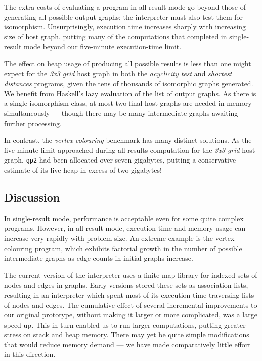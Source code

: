 The extra costs of evaluating a program in all-result mode go beyond those of generating all possible output graphs; the interpreter must also test them for isomorphism. Unsurprisingly, execution time increases sharply with increasing size of host graph, putting many of the computations that completed in single-result mode beyond our five-minute execution-time limit.

The effect on heap usage of producing all possible results is less than one might expect for the \textit{3x3 grid} host graph in both the \textit{acyclicity test} and \textit{shortest distances} programs, given the tens of thousands of isomorphic graphs generated. We benefit from Haskell's lazy evaluation of the list of output graphs.
As there is a single isomorphism class, at most two final host graphs are needed in memory simultaneously --- though there may be many intermediate graphs awaiting further processing.

In contrast, the \textit{vertex colouring} benchmark has many distinct solutions.
As the five minute limit approached during all-results computation for the \textit{3x3 grid} host graph, \texttt{gp2} had been allocated over seven gigabytes, putting a conservative estimate of its live heap in excess of two gigabytes!

\subsection{Discussion}

In single-result mode, performance is acceptable even for some quite complex programs. However, in all-result mode, execution time and memory usage can increase very rapidly with problem size. An extreme example is the vertex-colouring program, which exhibits factorial growth in the number of possible intermediate graphs as edge-counts in initial graphs increase.

The current version of the interpreter uses a finite-map library for indexed sets of nodes and edges in graphs.
Early versions stored these sets as association lists, resulting in an interpreter which spent most of its
execution time traversing lists of nodes and edges.
The cumulative effect of several incremental improvements to our original prototype, without making it larger or
more complicated, was a large speed-up. This in turn enabled us to run larger computations,
putting greater stress on stack and heap memory.  There may yet be quite simple modifications that would reduce
memory demand --- we have made comparatively little effort in this direction.


